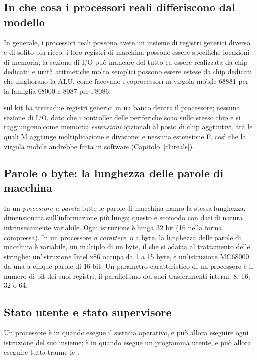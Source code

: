 \subsection{In che cosa i processori reali differiscono dal modello}

In generale, i processori reali possono avere un insieme di registri generici
diverso e di solito più ricco; i loro registri di macchina possono essere
specifiche locazioni di memoria; la sezione di I/O può mancare del tutto ed
essere realizzata da chip dedicati; e unità aritmetiche molto semplici possono
essere estese da chip dedicati che migliorano la ALU, come facevano i
coprocessori in virgola mobile 68881 per la famiglia 68000 e 8087 per l'8086.

\riscv sul kit \prg ha trentadue registri generici in un banco dentro il
processore; nessuna sezione di I/O, dato che i controller delle periferiche
sono sullo stesso chip e si raggiungono come memoria; \emph{estensioni}
opzionali al posto di chip aggiuntivi, tra le quali M aggiunge moltiplicazione
e divisione; e nessuna estensione F, così che la virgola mobile andrebbe fatta
in software (Capitolo~\ref{ch:reals}).

\subsection{Parole o byte: la lunghezza delle parole di macchina}

In un \emph{processore a parola} tutte le parole di macchina hanno la stessa
lunghezza, dimensionata sull'informazione più lunga; questo è scomodo con dati
di natura intrinsecamente variabile. Ogni istruzione \riscv è lunga 32 bit (16
nella forma compressa). In un processore \emph{a carattere}, o a byte, la
lunghezza delle parole di macchina è variabile, un multiplo di un byte, il che
si adatta al trattamento delle stringhe: un'istruzione Intel x86 occupa da 1 a
15 byte, e un'istruzione MC68000 da una a cinque parole di 16 bit. Un parametro
caratteristico di un processore è il numero di bit dei suoi registri, il
parallelismo dei suoi trasferimenti interni: 8, 16, 32 o 64.

\subsection{Stato utente e stato supervisore}

Un processore è in  quando esegue il sistema
operativo, e può allora eseguire ogni istruzione del suo insieme; è in
 quando esegue un programma utente, e può allora eseguire
tutto tranne le .

